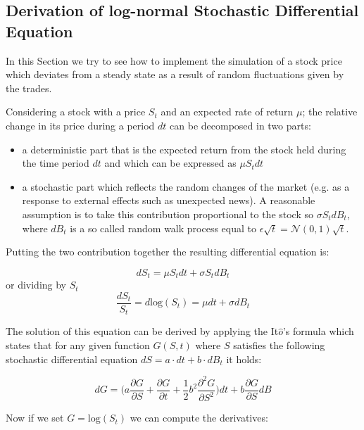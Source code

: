 \subsection{Derivation of log-normal Stochastic Differential
Equation}\label{derivation-of-log-normal-stochastic-differential-equation}

In this Section we try to see how to implement the simulation of a stock price which deviates from a steady state as a result of random fluctuations given by the trades. 

Considering a stock with a price \(S_t\) and an expected rate of return \(\mu\); the relative change in its price during a period \(dt\) can be decomposed in two parts:

\begin{itemize}
\tightlist
\item
  a deterministic part that is the expected return from the stock held
  during the time period \(dt\) and which can be expressed as \(\mu S_tdt\)
\item
  a stochastic part which reflects the random changes of the market
  (e.g. as a response to external effects such as unexpected news). A
  reasonable assumption is to take this contribution proportional to the
  stock so \(\sigma S_t dB_t\), where \(dB_t\) is a so called random walk process equal to \(\epsilon\sqrt{t}=\mathcal{N}(0,1)\sqrt{t}\).
\end{itemize}
Putting the two contribution together the resulting differential equation is:

\begin{equation}
  dS_t = \mu S_tdt + \sigma S_tdB_t
  \label{eq:differential}
\end{equation}
or dividing by $S_t$
\[\frac{dS_t}{S_t} = d\textrm{log}(S_t) = \mu dt + \sigma dB_t\]

    The solution of this equation can be derived by applying the
It\(\hat{o}\)'s formula which states that for any given function
\(G(S, t)\) where \(S\) satisfies the following stochastic differential
equation \(dS=a\cdot dt +b\cdot dB_t\) it holds:

\begin{equation}
dG=\big(a\frac{\partial G}{\partial S} + \frac{\partial G}{\partial t} + \frac{1}{2}b^2\frac{\partial^2 G}{\partial S^2} \big)dt + b \frac{\partial G}{\partial S}dB
\label{eq:itos_lemma}
\end{equation}

Now if we set \(G = \textrm{log}(S_t)\) we can compute the derivatives:

